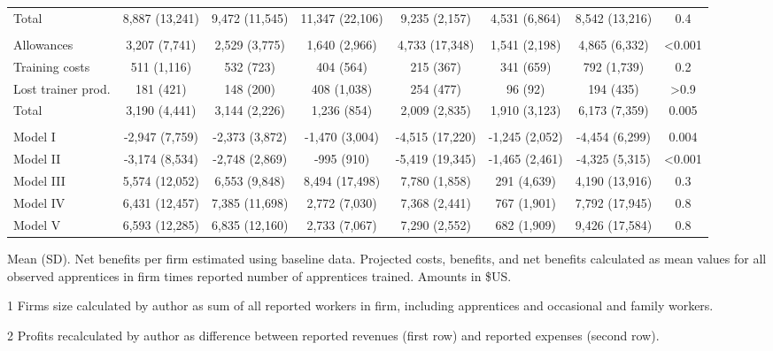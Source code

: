 \documentclass[
  11pt,
a4paper
]{report}
\begin{document}
\begin{landscape}
\begin{table}[H]
{\begin{threeparttable}
\begin{tabular}[t]{lccccccc}
\hspace{1em}Total & 8,887 (13,241) & 9,472 (11,545) & 11,347 (22,106) & 9,235 (2,157) & 4,531 (6,864) & 8,542 (13,216) & 0.4\\
\addlinespace[0.3em]
\multicolumn{8}{l}{\textbf{Projected costs}}\\
\hspace{1em}Allowances & 3,207 (7,741) & 2,529 (3,775) & 1,640 (2,966) & 4,733 (17,348) & 1,541 (2,198) & 4,865 (6,332) & <0.001\\
\hspace{1em}Training costs & 511 (1,116) & 532 (723) & 404 (564) & 215 (367) & 341 (659) & 792 (1,739) & 0.2\\
\hspace{1em}Lost trainer prod. & 181 (421) & 148 (200) & 408 (1,038) & 254 (477) & 96 (92) & 194 (435) & >0.9\\
\hspace{1em}Total & 3,190 (4,441) & 3,144 (2,226) & 1,236 (854) & 2,009 (2,835) & 1,910 (3,123) & 6,173 (7,359) & 0.005\\
\addlinespace[0.3em]
\multicolumn{8}{l}{\textbf{Net benefits}}\\
\hspace{1em}Model I & -2,947 (7,759) & -2,373 (3,872) & -1,470 (3,004) & -4,515 (17,220) & -1,245 (2,052) & -4,454 (6,299) & 0.004\\
\hspace{1em}Model II & -3,174 (8,534) & -2,748 (2,869) & -995 (910) & -5,419 (19,345) & -1,465 (2,461) & -4,325 (5,315) & <0.001\\
\hspace{1em}Model III & 5,574 (12,052) & 6,553 (9,848) & 8,494 (17,498) & 7,780 (1,858) & 291 (4,639) & 4,190 (13,916) & 0.3\\
\hspace{1em}Model IV & 6,431 (12,457) & 7,385 (11,698) & 2,772 (7,030) & 7,368 (2,441) & 767 (1,901) & 7,792 (17,945) & 0.8\\
\hspace{1em}Model V & 6,593 (12,285) & 6,835 (12,160) & 2,733 (7,067) & 7,290 (2,552) & 682 (1,909) & 9,426 (17,584) & 0.8\\
\bottomrule
\end{tabular}
\begin{tablenotes}
\small
\item Mean (SD). Net benefits per firm estimated using baseline data. 
Projected costs, benefits, and net benefits calculated as mean values for all observed apprentices in 
firm times reported number of apprentices trained. Amounts in \$US.
\item[1] Firms size calculated by author as sum of all reported workers in firm, including apprentices and occasional and family workers.
\item[2] Profits recalculated by author as difference between reported revenues (first row) and reported expenses (second row).
\end{tablenotes}
\end{threeparttable}}
\end{table}


\end{landscape}
\end{document}
